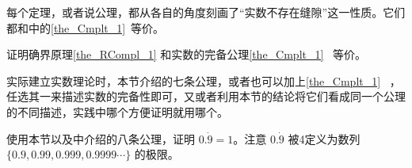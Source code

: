 每个定理，或者说公理，都从各自的角度刻画了“实数不存在缝隙”这一性质。它们都和中的\autoref{the_Cmplt_1}~等价。

\begin{exercise}{}
证明确界原理\autoref{the_RCompl_1} 和实数的完备公理\autoref{the_Cmplt_1}~ 等价。
\end{exercise}

实际建立实数理论时，本节介绍的七条公理，或者也可以加上\autoref{the_Cmplt_1}~ ，任选其一来描述实数的完备性即可，又或者利用本节的结论将它们看成同一个公理的不同描述，实践中哪个方便证明就用哪个。

\begin{exercise}{}
使用本节以及中介绍的八条公理，证明 $0.\dot{9}=1$。注意 $0.\dot{9}$ 被4定义为数列 $\{0.9, 0.99, 0.999, 0.9999\cdots\}$ 的极限。
\end{exercise}













